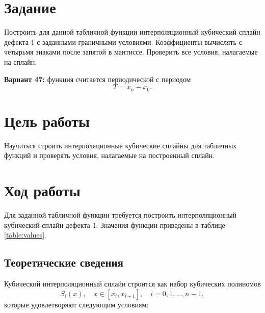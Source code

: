 \section{Задание}
Построить для данной табличной функции интерполяционный кубический сплайн дефекта 1 с заданными граничными условиями. Коэффициенты вычислять с четырьмя знаками после запятой в мантиссе. Проверить все условия, налагаемые на сплайн.

\medskip
\noindent\textbf{Вариант 47:} функция считается периодической с периодом
\[
T = x_n - x_0.
\]

\section{Цель работы}
Научиться строить интерполяционные кубические сплайны для табличных функций и проверять условия, налагаемые на построенный сплайн.

\section{Ход работы}

Для заданной табличной функции требуется построить интерполяционный кубический сплайн дефекта 1. Значения функции приведены в таблице \ref{table:values}.

\begin{table}[H]
    \centering
    \caption{Значения $x_i,y_i$ для построения кубического сплайна}
    \label{table:values}
\end{table}

\subsection{Теоретические сведения}

Кубический интерполяционный сплайн строится как набор кубических полиномов
\[
S_i(x), \quad x \in [x_i, x_{i+1}], \quad i = 0, 1, \dots, n-1,
\]
которые удовлетворяют следующим условиям:

